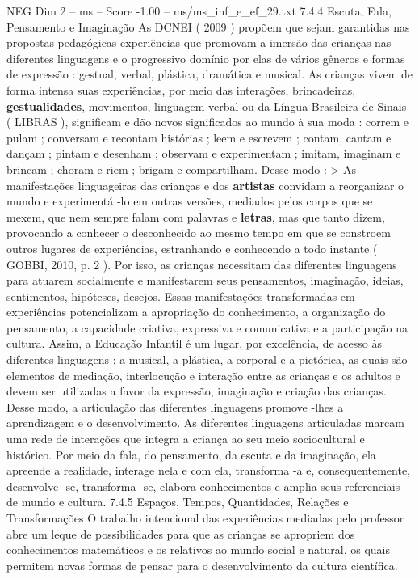 \begin{textsample}{NEG Dim 2 – ms – Score -1.00 – ms/ms\_inf\_e\_ef\_29.txt}  \label{ex:f2_neg_243}
7.4.4 Escuta, Fala, Pensamento e Imaginação As DCNEI ( 2009 ) propõem que sejam garantidas nas propostas pedagógicas experiências que promovam a imersão das crianças nas diferentes linguagens e o progressivo domínio por elas de vários gêneros e formas de expressão : gestual, verbal, plástica, dramática e musical.
As crianças vivem de forma intensa suas experiências, por meio das interações, brincadeiras, \textbf{gestualidades}, movimentos, linguagem verbal ou da Língua Brasileira de Sinais ( LIBRAS ), significam e dão novos significados ao mundo à sua moda : correm e pulam ; conversam e recontam histórias ; leem e escrevem ; contam, cantam e dançam ; pintam e desenham ; observam e experimentam ; imitam, imaginam e brincam ; choram e riem ; brigam e compartilham.
Desse modo : > As manifestações linguageiras das crianças e dos \textbf{artistas} convidam a reorganizar o mundo e experimentá -lo em outras versões, mediados pelos corpos que se mexem, que nem sempre falam com palavras e \textbf{letras}, mas que tanto dizem, provocando a conhecer o desconhecido ao mesmo tempo em que se constroem outros lugares de experiências, estranhando e conhecendo a todo instante ( GOBBI, 2010, p. 2 ).
Por isso, as crianças necessitam das diferentes linguagens para atuarem socialmente e manifestarem seus pensamentos, imaginação, ideias, sentimentos, hipóteses, desejos.
Essas manifestações transformadas em experiências potencializam a apropriação do conhecimento, a organização do pensamento, a capacidade criativa, expressiva e comunicativa e a participação na cultura.
Assim, a Educação Infantil é um lugar, por excelência, de acesso às diferentes linguagens : a musical, a plástica, a corporal e a pictórica, as quais são elementos de mediação, interlocução e interação entre as crianças e os adultos e devem ser utilizadas a favor da expressão, imaginação e criação das crianças.
Desse modo, a articulação das diferentes linguagens promove -lhes a aprendizagem e o desenvolvimento.
As diferentes linguagens articuladas marcam uma rede de interações que integra a criança ao seu meio sociocultural e histórico.
Por meio da fala, do pensamento, da escuta e da imaginação, ela apreende a realidade, interage nela e com ela, transforma -a e, consequentemente, desenvolve -se, transforma -se, elabora conhecimentos e amplia seus referenciais de mundo e cultura. 7.4.5 Espaços, Tempos, Quantidades, Relações e Transformações O trabalho intencional das experiências mediadas pelo professor abre um leque de possibilidades para que as crianças se apropriem dos conhecimentos matemáticos e os relativos ao mundo social e natural, os quais permitem novas formas de pensar para o desenvolvimento da cultura científica.

\end{textsample}
